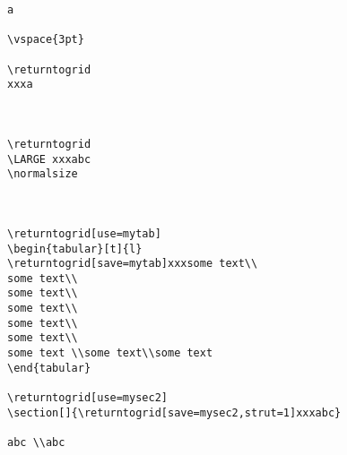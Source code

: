 \documentclass[twoside,parskip=half-,fontsize=12pt,egregdoesnotlikesansseriftitles,headings=normal]{scrartcl}
\begin{document}
\newpage 
\ClearShipoutPictureBG
{}
\begin{lstlisting}
a

\vspace{3pt}

\returntogrid
xxxa



\returntogrid
\LARGE xxxabc
\normalsize



\returntogrid[use=mytab]
\begin{tabular}[t]{l}
\returntogrid[save=mytab]xxxsome text\\
some text\\
some text\\
some text\\
some text\\
some text\\
some text \\some text\\some text
\end{tabular}

\returntogrid[use=mysec2]
\section[]{\returntogrid[save=mysec2,strut=1]xxxabc}

abc \\abc
\end{lstlisting}
\end{document}
